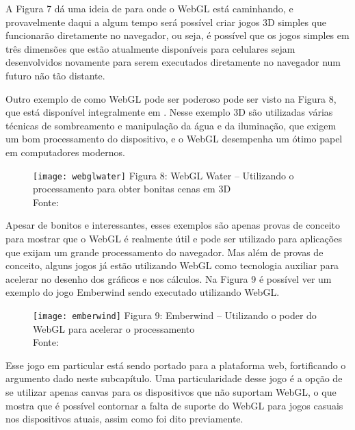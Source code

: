 A Figura 7 dá uma ideia de para onde o WebGL está
caminhando, e provavelmente daqui a algum tempo será possível criar
jogos 3D simples que funcionarão diretamente no navegador, ou seja,
é possível que os jogos simples em três dimensões que estão atualmente
disponíveis para celulares sejam desenvolvidos novamente para
serem executados diretamente no navegador num futuro não tão distante.

Outro exemplo de como WebGL pode ser poderoso pode ser visto na
Figura 8,
que está disponível integralmente em .
Nesse exemplo 3D são utilizadas várias técnicas de sombreamento e
manipulação da água e da iluminação, que exigem um bom processamento
do dispositivo, e o WebGL desempenha um ótimo papel em computadores
modernos.

\begin{figure}[H]
  \centering
	\texttt{[image: webglwater]}
	\footnotesize\hspace{8\baselineskip}
	Figura 8: WebGL Water {--} Utilizando o processamento para obter bonitas cenas em 3D \\
	Fonte: 
  \label{img:webglwater}
\end{figure}

Apesar de bonitos e interessantes, esses exemplos são apenas provas de
conceito para mostrar que o WebGL é realmente útil e pode ser
utilizado para aplicações que exijam um grande processamento do
navegador. Mas além de provas de conceito, alguns jogos já estão
utilizando WebGL como tecnologia auxiliar para acelerar no desenho dos
gráficos e nos cálculos.
Na Figura 9 é possível ver um exemplo do jogo Emberwind
sendo executado utilizando WebGL.

\begin{figure}[H]
  \centering
	\texttt{[image: emberwind]}
	\footnotesize\hspace{8\baselineskip}
	Figura 9: Emberwind {--} Utilizando o poder do WebGL para acelerar o processamento \\
	Fonte: 
  \label{img:emberwind}
\end{figure}

Esse jogo em particular está sendo portado para a plataforma web,
fortificando o argumento dado neste subcapítulo. Uma particularidade
desse jogo é a opção de se utilizar apenas canvas para os dispositivos
que não suportam WebGL, o que mostra que é possível contornar a falta
de suporte do WebGL para jogos casuais nos dispositivos atuais, assim
como foi dito previamente.

\clearpage
